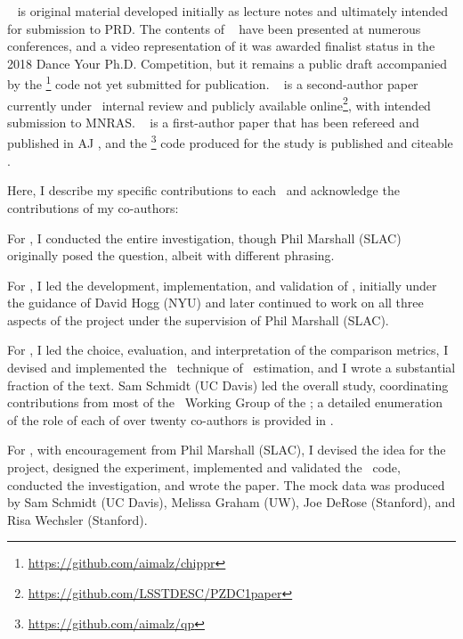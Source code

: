 \chapname~ is original material developed initially as lecture notes and ultimately intended for submission to PRD.
The contents of \chapname~ have been presented at numerous conferences, and a video representation of it was awarded finalist status in the 2018 Dance Your Ph.D. Competition, but it remains a public draft accompanied by the \chippr\footnote{\url{https://github.com/aimalz/chippr}} code not yet submitted for publication.
\chapname~ is a second-author paper currently under \desc\ internal review and publicly available online\footnote{\url{https://github.com/LSSTDESC/PZDC1paper}}, with intended submission to MNRAS.
\chapname~ is a first-author paper that has been refereed and published in AJ \citep{malz_approximating_2018}, and the \qp\footnote{\url{https://github.com/aimalz/qp}} code produced for the study is published and citeable \citep{malz_qp_2017}.

Here, I describe my specific contributions to each \chapname\ and acknowledge the contributions of my co-authors:
\begin{enumerate}

{\item For , I conducted the entire investigation, though Phil Marshall (SLAC) originally posed the question, albeit with different phrasing.}

{\item For , I led the development, implementation, and validation of \Chippr, initially under the guidance of David Hogg (NYU) and later continued to work on all three aspects of the project under the supervision of Phil Marshall (SLAC).}

{\item For , I led the choice, evaluation, and interpretation of the comparison metrics, I devised and implemented the \trainz\ technique of \pzpdf\ estimation, and I wrote a substantial fraction of the text.
	Sam Schmidt (UC Davis) led the overall study, coordinating contributions from most of the \Pz\ Working Group of the \desc; a detailed enumeration of the role of each of over twenty co-authors is provided in .}

{\item For , with encouragement from Phil Marshall (SLAC), I devised the idea for the project, designed the experiment, implemented and validated the \qp\ code, conducted the investigation, and wrote the paper.
	The mock data was produced by Sam Schmidt (UC Davis), Melissa Graham (UW), Joe DeRose (Stanford), and Risa Wechsler (Stanford).}

\end{enumerate}
